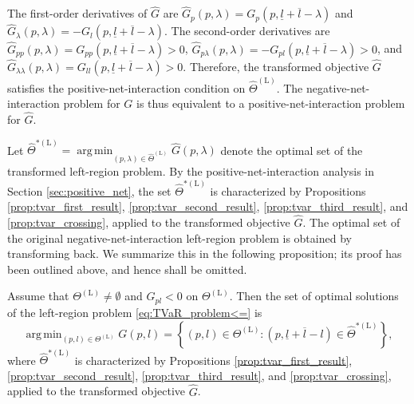 \documentclass[a4paper,12pt]{article}
\DeclareMathOperator*{\argmin}{arg\,min}
\begin{document}
The first-order derivatives of $\hat{G}$ are $\hat{G}_p\left(p,\lambda\right)=G_p\left(p,\underline{l}+\overline{l}-\lambda\right)$ and $\hat{G}_{\lambda}\left(p,\lambda\right)=-G_l\left(p,\underline{l}+\overline{l}-\lambda\right)$. The second-order derivatives are $\hat{G}_{pp}\left(p,\lambda\right)=G_{pp}\left(p,\underline{l}+\overline{l}-\lambda\right)>0$, $\hat{G}_{p\lambda}\left(p,\lambda\right)=-G_{pl}\left(p,\underline{l}+\overline{l}-\lambda\right)>0$, and $\hat{G}_{\lambda\lambda}\left(p,\lambda\right)=G_{ll}\left(p,\underline{l}+\overline{l}-\lambda\right)>0$. Therefore, the transformed objective $\hat{G}$ satisfies the positive-net-interaction condition on $\hat{\Theta}^{\left(\text{L}\right)}$. The negative-net-interaction problem for $G$ is thus equivalent to a positive-net-interaction problem for $\hat{G}$.

Let $\hat{\Theta}^{*\left(\text{L}\right)}=\argmin_{\left(p,\lambda\right)\in\hat{\Theta}^{\left(\text{L}\right)}}\hat{G}\left(p,\lambda\right)$ denote the optimal set of the transformed left-region problem. By the positive-net-interaction analysis in Section \ref{sec:positive_net}, the set $\hat{\Theta}^{*\left(\text{L}\right)}$ is characterized by Propositions \ref{prop:tvar_first_result}, \ref{prop:tvar_second_result}, \ref{prop:tvar_third_result}, and \ref{prop:tvar_crossing}, applied to the transformed objective $\hat{G}$. The optimal set of the original negative-net-interaction left-region problem is obtained by transforming back. We summarize this in the following proposition; its proof has been outlined above, and hence shall be omitted.

\begin{proposition}\label{prop:tvar_negative_net}
Assume that $\Theta^{\left(\text{L}\right)}\neq\emptyset$ and $G_{pl}<0$ on $\Theta^{\left(\text{L}\right)}$. Then the set of optimal solutions of the left-region problem \eqref{eq:TVaR_problem<=} is
\begin{equation*}
\argmin_{\left(p,l\right)\in\Theta^{\left(\text{L}\right)}}G\left(p,l\right)=\left\{\left(p,l\right)\in\Theta^{\left(\text{L}\right)}:\left(p,\underline{l}+\overline{l}-l\right)\in\hat{\Theta}^{*\left(\text{L}\right)}\right\},
\end{equation*}
where $\hat{\Theta}^{*\left(\text{L}\right)}$ is characterized by Propositions \ref{prop:tvar_first_result}, \ref{prop:tvar_second_result}, \ref{prop:tvar_third_result}, and \ref{prop:tvar_crossing}, applied to the transformed objective $\hat{G}$.
\end{proposition}
\end{document}
